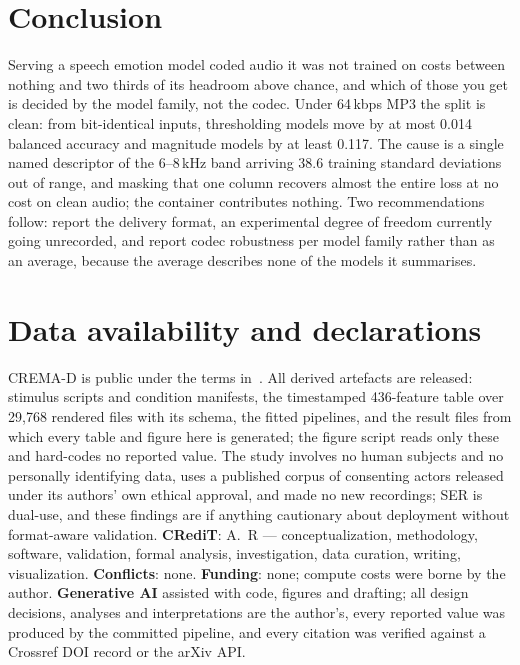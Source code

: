 \documentclass[a4paper,9pt,twocolumn]{extarticle}
\begin{document}
\section{Conclusion}
Serving a speech emotion model coded audio it was not trained on costs between
nothing and two thirds of its headroom above chance, and which of those you get
is decided by the model family, not the codec. Under 64\,kbps MP3 the split is
clean: from bit-identical inputs, thresholding models move by at most 0.014
balanced accuracy and magnitude models by at least 0.117. The cause is a single
named descriptor of the 6--8\,kHz band arriving 38.6 training standard
deviations out of range, and masking that one column recovers almost the entire
loss at no cost on clean audio; the container contributes nothing. Two
recommendations follow: report the delivery format, an experimental degree of
freedom currently going unrecorded, and report codec robustness per model
family rather than as an average, because the average describes none of the
models it summarises.

\section{Data availability and declarations}
\scriptsize\noindent
CREMA-D is public under the terms in~\cite{cao2014cremad}. All derived
artefacts are released: stimulus scripts and condition manifests, the
timestamped 436-feature table over 29{,}768 rendered files with its schema, the
fitted pipelines, and the result files from which every table and figure here
is generated; the figure script reads only these and hard-codes no reported
value. The study involves no human subjects and no personally identifying data,
uses a published corpus of consenting actors released under its authors' own
ethical approval, and made no new recordings; SER is dual-use, and these
findings are if anything cautionary about deployment without format-aware
validation. \textbf{CRediT}: A.~R --- conceptualization, methodology, software,
validation, formal analysis, investigation, data curation, writing,
visualization. \textbf{Conflicts}: none. \textbf{Funding}: none; compute costs
were borne by the author. \textbf{Generative AI} assisted with code, figures
and drafting; all design decisions, analyses and interpretations are the
author's, every reported value was produced by the committed pipeline, and
every citation was verified against a Crossref DOI record or the arXiv API.
\normalsize

\balance
\footnotesize


\end{document}
